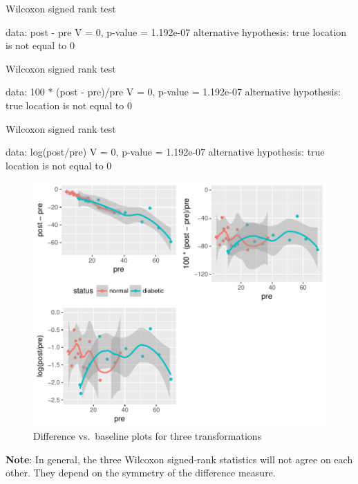 \begin{Schunk}
\begin{Soutput}
	Wilcoxon signed rank test

data:  post - pre
V = 0, p-value = 1.192e-07
alternative hypothesis: true location is not equal to 0


	Wilcoxon signed rank test

data:  100 * (post - pre)/pre
V = 0, p-value = 1.192e-07
alternative hypothesis: true location is not equal to 0


	Wilcoxon signed rank test

data:  log(post/pre)
V = 0, p-value = 1.192e-07
alternative hypothesis: true location is not equal to 0
\end{Soutput}
\begin{figure}[htbp]

\centerline{\includegraphics[width=\maxwidth]{change-analysis-1} }

\caption[Difference vs]{Difference vs.\ baseline plots for three transformations}\label{fig:change-analysis}
\end{figure}
\end{Schunk}
\textbf{Note}: In general, the three Wilcoxon signed-rank statistics
will not agree on each other.  They depend on the symmetry of the
difference measure.
\nocite{kai89,tor85how,mar85mod,kro93spu,col00sym}

